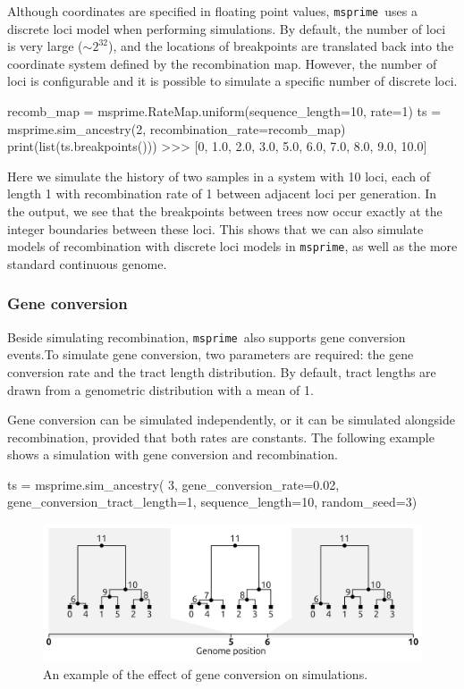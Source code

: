 \documentclass[graybox]{svmult}
\newcommand{\msprime}[0]{\texttt{msprime}}
\begin{document}
Although coordinates are specified in floating point values, \msprime\
uses a discrete loci model when performing simulations. By default, the
number of loci is very large (\(\sim 2^{32}\)), and the locations of
breakpoints are translated back into the coordinate system defined by
the recombination map. However, the number of loci is configurable and
it is possible to simulate a specific number of discrete
loci.

\begin{pythoncode}
recomb_map = msprime.RateMap.uniform(sequence_length=10, rate=1)
ts = msprime.sim_ancestry(2, recombination_rate=recomb_map)
print(list(ts.breakpoints()))
>>> [0, 1.0, 2.0, 3.0, 5.0, 6.0, 7.0, 8.0, 9.0, 10.0]
\end{pythoncode}

    Here we simulate the history of two samples in a system with 10 loci, each of
length 1 with recombination rate of 1 between adjacent loci per
generation. In the output, we see that the breakpoints between trees now
occur exactly at the integer boundaries between these loci. This shows that
we can also simulate models of recombination with discrete loci models
in \msprime, as well as the more standard continuous genome.

\subsubsection{Gene conversion}\label{gene-conversion}

Beside simulating recombination, \msprime\ also supports gene conversion events.To simulate gene conversion,
two parameters are required: the gene conversion rate and the tract length distribution. By default, tract lengths are drawn
from a genometric distribution with a mean of 1.

Gene conversion can be simulated independently, or it can be simulated alongside recombination, provided that both rates are constants.
The following example shows a simulation with gene conversion and recombination.

\begin{pythoncode}
ts = msprime.sim_ancestry(
    3, gene_conversion_rate=0.02, gene_conversion_tract_length=1,
    sequence_length=10, random_seed=3)
\end{pythoncode}

\begin{figure}
\begin{center}
\includegraphics[width=\textwidth]{images/gene_conversion.pdf}
\end{center}
\caption{\label{fig:gene_conversion} An example of the effect of gene conversion on simulations.}
\end{figure}
\end{document}
